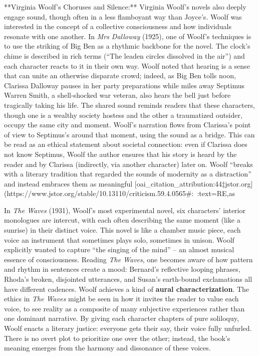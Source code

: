 \documentclass[12pt]{report}
\begin{document}
**Virginia Woolf’s Choruses and Silence:** Virginia Woolf’s novels also deeply engage sound, though often in a less flamboyant way than Joyce’s. Woolf was interested in the concept of a collective consciousness and how individuals resonate with one another. In \textit{Mrs Dalloway} (1925), one of Woolf’s techniques is to use the striking of Big Ben as a rhythmic backbone for the novel. The clock’s chime is described in rich terms (“The leaden circles dissolved in the air”) and each character reacts to it in their own way. Woolf noted that hearing is a sense that can unite an otherwise disparate crowd; indeed, as Big Ben tolls noon, Clarissa Dalloway pauses in her party preparations while miles away Septimus Warren Smith, a shell-shocked war veteran, also hears the bell just before tragically taking his life. The shared sound reminds readers that these characters, though one is a wealthy society hostess and the other a traumatized outsider, occupy the same city and moment. Woolf’s narration flows from Clarissa’s point of view to Septimus’s around that moment, using the sound as a bridge. This can be read as an ethical statement about societal connection: even if Clarissa does not know Septimus, Woolf the author ensures that his story is heard by the reader and by Clarissa (indirectly, via another character) later on. Woolf “breaks with a literary tradition that regarded the sounds of modernity as a distraction” and instead embraces them as meaningful [oai_citation_attribution:44‡jstor.org](https://www.jstor.org/stable/10.13110/criticism.59.4.0565#:~:text=RE,as%

In \textit{The Waves} (1931), Woolf’s most experimental novel, six characters’ interior monologues are intercut, with each often describing the same moment (like a sunrise) in their distinct voice. This novel is like a chamber music piece, each voice an instrument that sometimes plays solo, sometimes in unison. Woolf explicitly wanted to capture “the singing of the mind” – an almost musical essence of consciousness. Reading \textit{The Waves}, one becomes aware of how pattern and rhythm in sentences create a mood: Bernard’s reflective looping phrases, Rhoda’s broken, disjointed utterances, and Susan’s earth-bound exclamations all have different cadences. Woolf achieves a kind of \textbf{aural characterization}. The ethics in \textit{The Waves} might be seen in how it invites the reader to value each voice, to see reality as a composite of many subjective experiences rather than one dominant narrative. By giving each character chapters of pure soliloquy, Woolf enacts a literary justice: everyone gets their say, their voice fully unfurled. There is no overt plot to prioritize one over the other; instead, the book’s meaning emerges from the harmony and dissonance of these voices.
\end{document}
